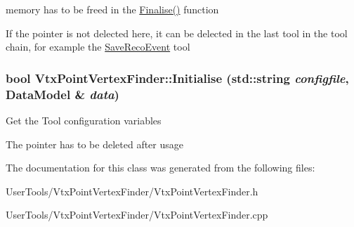memory has to be freed in the \hyperlink{classVtxPointVertexFinder_aa8161e8fd414eab8bf17766cb353aa91}{Finalise()} function

If the pointer is not delected here, it can be delected in the last tool in the tool chain, for example the \hyperlink{classSaveRecoEvent}{SaveRecoEvent} tool \hypertarget{classVtxPointVertexFinder_a5f022abdc58cbce7e071e596bcb1d75d}{
\subsubsection[{Initialise}]{\setlength{\rightskip}{0pt plus 5cm}bool VtxPointVertexFinder::Initialise (std::string {\em configfile}, \/  {\bf DataModel} \& {\em data})}}
\label{classVtxPointVertexFinder_a5f022abdc58cbce7e071e596bcb1d75d}


Get the Tool configuration variables

The pointer has to be deleted after usage 

The documentation for this class was generated from the following files:\begin{DoxyCompactItemize}
\item 
UserTools/VtxPointVertexFinder/VtxPointVertexFinder.h\item 
UserTools/VtxPointVertexFinder/VtxPointVertexFinder.cpp\end{DoxyCompactItemize}
